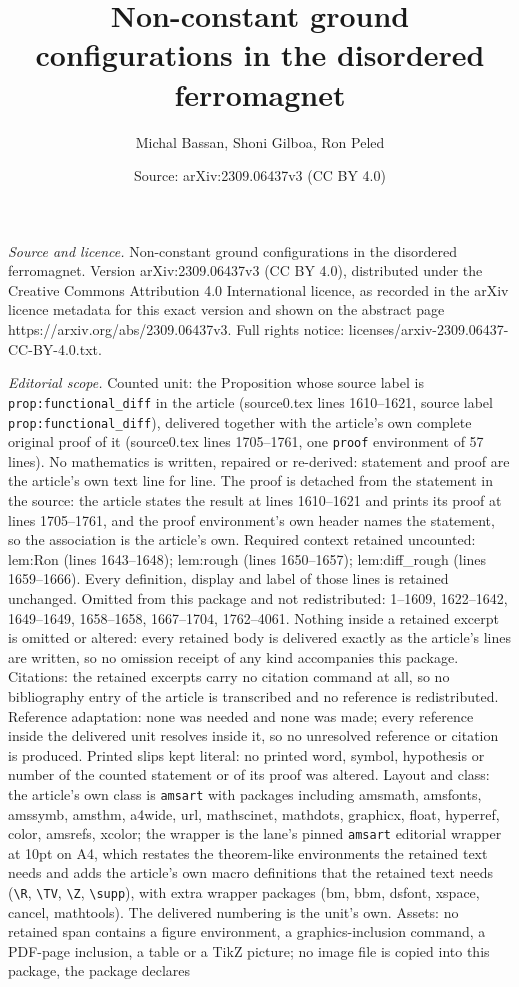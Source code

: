 \documentclass[10pt,a4paper]{amsart}
\title[Non-constant ground configurations in the disordered ferroma]{Non-constant ground configurations in the disordered ferromagnet}
\author{Michal Bassan, Shoni Gilboa, Ron Peled}
\date{Source: arXiv:2309.06437v3 (CC BY 4.0)}
\begin{document}
\maketitle

\noindent\emph{Source and licence.} Non-constant ground configurations in the disordered ferromagnet. Version arXiv:2309.06437v3 (CC BY 4.0), distributed under the Creative Commons Attribution 4.0 International licence, as recorded in the arXiv licence metadata for this exact version and shown on the abstract page https://arxiv.org/abs/2309.06437v3. Full rights notice: licenses/arxiv-2309.06437-CC-BY-4.0.txt.\par\smallskip

\noindent\textit{Editorial scope.} Counted unit: the Proposition whose source label is \texttt{prop:functional\_diff} in the article (source0.tex lines 1610--1621, source label \texttt{prop:functional\_diff}), delivered together with the article's own complete original proof of it (source0.tex lines 1705--1761, one \texttt{proof} environment of 57 lines). No mathematics is written, repaired or re-derived: statement and proof are the article's own text line for line. The proof is detached from the statement in the source: the article states the result at lines 1610--1621 and prints its proof at lines 1705--1761, and the proof environment's own header names the statement, so the association is the article's own. Required context retained uncounted: lem:Ron (lines 1643--1648); lem:rough (lines 1650--1657); lem:diff\_rough (lines 1659--1666). Every definition, display and label of those lines is retained unchanged. Omitted from this package and not redistributed: 1--1609, 1622--1642, 1649--1649, 1658--1658, 1667--1704, 1762--4061. Nothing inside a retained excerpt is omitted or altered: every retained body is delivered exactly as the article's lines are written, so no omission receipt of any kind accompanies this package. Citations: the retained excerpts carry no citation command at all, so no bibliography entry of the article is transcribed and no reference is redistributed. Reference adaptation: none was needed and none was made; every reference inside the delivered unit resolves inside it, so no unresolved reference or citation is produced. Printed slips kept literal: no printed word, symbol, hypothesis or number of the counted statement or of its proof was altered. Layout and class: the article's own class is \texttt{amsart} with packages including amsmath, amsfonts, amssymb, amsthm, a4wide, url, mathscinet, mathdots, graphicx, float, hyperref, color, amsrefs, xcolor; the wrapper is the lane's pinned \texttt{amsart} editorial wrapper at 10pt on A4, which restates the theorem-like environments the retained text needs and adds the article's own macro definitions that the retained text needs (\texttt{\textbackslash R}, \texttt{\textbackslash TV}, \texttt{\textbackslash Z}, \texttt{\textbackslash supp}), with extra wrapper packages (bm, bbm, dsfont, xspace, cancel, mathtools). The delivered numbering is the unit's own. Assets: no retained span contains a figure environment, a graphics-inclusion command, a PDF-page inclusion, a table or a TikZ picture; no image file is copied into this package, the package declares 
\end{document}

